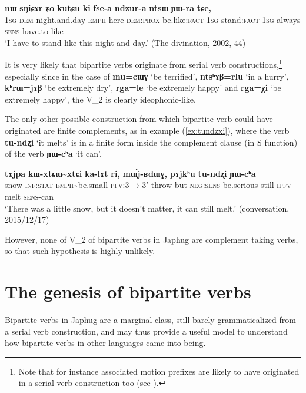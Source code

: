 \documentclass[11pt]{article}
\newcommand{\ipa}[1]{{\phon\textbf{#1}}}
\newcommand{\jpg}[2]{\ipa{#1} `#2'}
\newcommand{\refb}[1]{(\ref{#1})}
\newcommand{\tld}{\textasciitilde{}}
\begin{document}
\begin{exe}
\ex \label{ex:ki.fsea}
\gll \ipa{aʑo} 	\ipa{nɯ} 	\ipa{sŋiɕɤr} 	\ipa{ʑo} 	\ipa{kutɕu} 	\ipa{ki} 	\ipa{fse-a} 	\ipa{ndzur-a} 	\ipa{ntsɯ} 	\ipa{ɲɯ-ra} 	\ipa{tɕe,} \\
\textsc{1sg} \textsc{dem} night.and.day \textsc{emph} here \textsc{dem:prox} be.like:\textsc{fact-1sg} stand:\textsc{fact-1sg} always \textsc{sens}-have.to like \\
\glt `I have to stand like this night and day.' (The divination, 2002, 44)
\end{exe}

It is very likely that bipartite verbs originate from serial verb constructions,\footnote{Note that for instance associated motion prefixes are likely to have originated in a serial verb construction too (see \citealt{jacques13harmonization}).} especially since in the case of \jpg{mu=cɯɣ}{be  terrified}, \jpg{ntsʰɤβ=rlu}{in a hurry}, \jpg{kʰrɯ=jɤβ}{be extremely dry}, \jpg{rga=le}{be extremely happy} and \jpg{rga=χi}{be extremely happy}, the V_2 is clearly ideophonic-like. 

The only other possible construction from which bipartite verb could have originated are finite complements, as in example \refb{ex:tundzxi}, where the verb \ipa{tu-ndʐi} `it melts' is in a finite form inside the complement clause (in S function) of the verb 	\ipa{ɲɯ-cʰa} `it can'.

\begin{exe}
\ex \label{ex:tundzxi}
\gll 
\ipa{tɤjpa} 	\ipa{kɯ-xtɕɯ\tld{}xtɕi} 	\ipa{ka-lɤt} 	\ipa{ri,} 	\ipa{mɯ́j-ʁdɯɣ,} 	\ipa{pɤjkʰu} 	\ipa{tu-ndʐi} 	\ipa{ɲɯ-cʰa} \\
snow \textsc{inf:stat-emph}\tld{}be.small \textsc{pfv}:3$\rightarrow$3'-throw but \textsc{neg:sens}-be.serious still \textsc{ipfv}-melt \textsc{sens}-can \\
\glt `There was a little snow, but it doesn't matter, it can still melt.' (conversation, 2015/12/17)
\end{exe}

However, none of V_2 of bipartite verbs in Japhug are complement taking verbs, so that such hypothesis is highly unlikely. 

\section{The genesis of bipartite verbs} \label{sec:genesis}
Bipartite verbs in Japhug are a marginal class, still barely grammaticalized from a serial verb construction, and may thus provide a useful model to understand how bipartite verbs in other languages came into being. 
\end{document}
